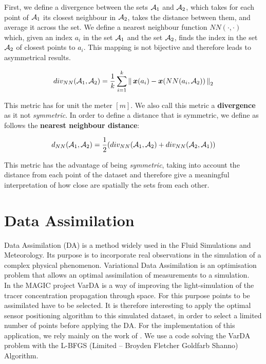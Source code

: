 First, we define a divergence between the sets $\mathcal{A}_1$ and $\mathcal{A}_2$, which takes for each point of $\mathcal{A}_1$ its closest neighbour in $\mathcal{A}_2$, takes the distance between them, and average it across the set. We define a nearest neighbour function $NN(\cdot,\cdot)$ which, given an index $a_i$ in the set $\mathcal{A}_1$ and the set $\mathcal{A}_2$, finds the index in the set $\mathcal{A}_2$ of closest points to $a_i$. This mapping is not bijective and therefore leads to asymmetrical results. 

\begin{equation}
    div_{NN}(\mathcal{A}_1,\mathcal{A}_2) = \frac{1}{k}\sum_{i=1}^k \left \lVert \,{\boldsymbol{{x}}}(a_i) - {\boldsymbol{{x}}}(NN(a_i,\mathcal{A}_2))\, \right \rVert_2
\end{equation}

This metric has for unit the meter $[m]$. We also call this metric a \textbf{divergence} as it not \textit{symmetric}. In order to define a distance that is symmetric, we define as follows the \textbf{nearest neighbour distance}:

\begin{equation}
    d_{NN}(\mathcal{A}_1,\mathcal{A}_2) = \frac{1}{2} (div_{NN}(\mathcal{A}_1,\mathcal{A}_2) + div_{NN}(\mathcal{A}_2,\mathcal{A}_1))
    \label{equ:distNN}
\end{equation}

This metric has the advantage of being \textit{symmetric}, taking into account the distance from each point of the dataset and therefore give a meaningful interpretation of how close are spatially the sets from each other. 

\section{Data Assimilation}

Data Assimilation (DA) is a method widely used in the Fluid Simulations and Meteorology. Its purpose is to incorporate real observations in the simulation of a complex physical phenomenon. Variational Data Assimilation is an optimisation problem that allows an optimal assimilation of measurements to a simulation.  \\

In the MAGIC project VarDA is a way of improving the light-simulation of the tracer concentration propagation through space. For this purpose points to be assimilated have to be selected. It is therefore interesting to apply the optimal sensor positioning algorithm to this simulated dataset, in order to select a limited number of points before applying the DA. For the implementation of this application, we rely mainly on the work of \citet{arcucci_optimal_2019}. We use a code solving the VarDA problem with the L-BFGS (Limited – Broyden Fletcher Goldfarb Shanno) Algorithm. \\

